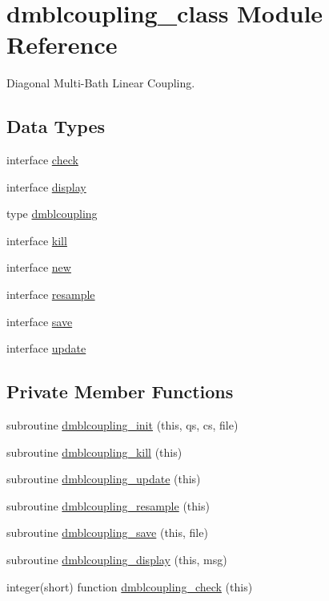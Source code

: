 \hypertarget{classdmblcoupling__class}{\section{dmblcoupling\+\_\+class Module Reference}
\label{classdmblcoupling__class}
}


Diagonal Multi-\/\+Bath Linear Coupling.  


\subsection*{Data Types}
\begin{DoxyCompactItemize}
\item 
interface \hyperlink{interfacedmblcoupling__class_1_1check}{check}
\item 
interface \hyperlink{interfacedmblcoupling__class_1_1display}{display}
\item 
type \hyperlink{structdmblcoupling__class_1_1dmblcoupling}{dmblcoupling}
\item 
interface \hyperlink{interfacedmblcoupling__class_1_1kill}{kill}
\item 
interface \hyperlink{interfacedmblcoupling__class_1_1new}{new}
\item 
interface \hyperlink{interfacedmblcoupling__class_1_1resample}{resample}
\item 
interface \hyperlink{interfacedmblcoupling__class_1_1save}{save}
\item 
interface \hyperlink{interfacedmblcoupling__class_1_1update}{update}
\end{DoxyCompactItemize}
\subsection*{Private Member Functions}
\begin{DoxyCompactItemize}
\item 
subroutine \hyperlink{classdmblcoupling__class_a4487405d5c1e31a9337bd7af6b7674e6}{dmblcoupling\+\_\+init} (this, qs, cs, file)
\item 
subroutine \hyperlink{classdmblcoupling__class_a313cde032dcbe2b6337777761e020699}{dmblcoupling\+\_\+kill} (this)
\item 
subroutine \hyperlink{classdmblcoupling__class_a08e27168f5a824e5177a7a5f0821c9cb}{dmblcoupling\+\_\+update} (this)
\item 
subroutine \hyperlink{classdmblcoupling__class_a8084e25865ced19866a492ee82f7ad96}{dmblcoupling\+\_\+resample} (this)
\item 
subroutine \hyperlink{classdmblcoupling__class_ab270fc6f682c8fcf3c654a937c4105d5}{dmblcoupling\+\_\+save} (this, file)
\item 
subroutine \hyperlink{classdmblcoupling__class_a204822b8993320449860c1240b46d5ad}{dmblcoupling\+\_\+display} (this, msg)
\item 
integer(short) function \hyperlink{classdmblcoupling__class_a59661dec6ece5671a02d74811864e710}{dmblcoupling\+\_\+check} (this)
\end{DoxyCompactItemize}


